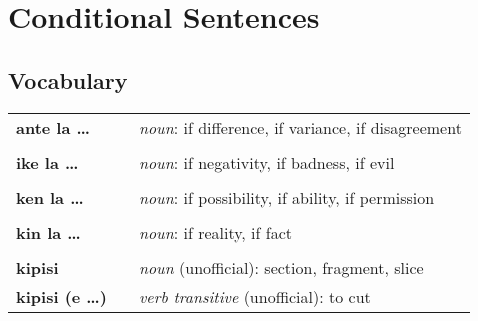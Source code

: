 \section{Conditional Sentences}
%
\subsection*{Vocabulary}
%
\begin{supertabular}{p{2,5cm}|ll}
    \textbf{ante la \dots}    &  & \textit{noun}: if difference, if variance, if disagreement                         \\ %
                              &  &                                                                                    \\ %
    \textbf{ike la \dots}     &  & \textit{noun}: if negativity, if badness, if evil                                  \\ %
                              &  &                                                                                    \\ %
    \textbf{ken la \dots}     &  & \textit{noun}: if possibility, if ability, if permission                           \\ %
                              &  &                                                                                    \\ %
    \textbf{kin la \dots}     &  & \textit{noun}: if reality, if fact                                                 \\  %
                              &  &                                                                                    \\ %
    \textbf{kipisi}           &  & \textit{noun} (unofficial): section, fragment, slice                               \\ %
    \textbf{kipisi (e \dots)} &  & \textit{verb transitive} (unofficial): to cut                                      \\ %

\end{supertabular}
